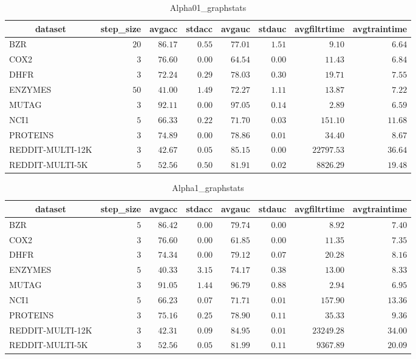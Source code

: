 \begin{table}[!tbp]
\caption{Alpha01_graphstats\label{Alpha01_graphstats}} 
{\centering
\begin{tabular}{lrrrrrrr}
\hline\hline
\multicolumn{1}{c}{dataset}&\multicolumn{1}{c}{step_size}&\multicolumn{1}{c}{avgacc}&\multicolumn{1}{c}{stdacc}&\multicolumn{1}{c}{avgauc}&\multicolumn{1}{c}{stdauc}&\multicolumn{1}{c}{avgfiltrtime}&\multicolumn{1}{c}{avgtraintime}\tabularnewline
\hline
BZR&$20$&$86.17$&$0.55$&$77.01$&$1.51$&$    9.10$&$ 6.64$\tabularnewline
COX2&$ 3$&$76.60$&$0.00$&$64.54$&$0.00$&$   11.43$&$ 6.84$\tabularnewline
DHFR&$ 3$&$72.24$&$0.29$&$78.03$&$0.30$&$   19.71$&$ 7.55$\tabularnewline
ENZYMES&$50$&$41.00$&$1.49$&$72.27$&$1.11$&$   13.87$&$ 7.22$\tabularnewline
MUTAG&$ 3$&$92.11$&$0.00$&$97.05$&$0.14$&$    2.89$&$ 6.59$\tabularnewline
NCI1&$ 5$&$66.33$&$0.22$&$71.70$&$0.03$&$  151.10$&$11.68$\tabularnewline
PROTEINS&$ 3$&$74.89$&$0.00$&$78.86$&$0.01$&$   34.40$&$ 8.67$\tabularnewline
REDDIT-MULTI-12K&$ 3$&$42.67$&$0.05$&$85.15$&$0.00$&$22797.53$&$36.64$\tabularnewline
REDDIT-MULTI-5K&$ 5$&$52.56$&$0.50$&$81.91$&$0.02$&$ 8826.29$&$19.48$\tabularnewline
\hline
\end{tabular}}
\end{table}
\begin{table}[!tbp]
\caption{Alpha1_graphstats\label{Alpha1_graphstats}} 
{\centering
\begin{tabular}{lrrrrrrr}
\hline\hline
\multicolumn{1}{c}{dataset}&\multicolumn{1}{c}{step_size}&\multicolumn{1}{c}{avgacc}&\multicolumn{1}{c}{stdacc}&\multicolumn{1}{c}{avgauc}&\multicolumn{1}{c}{stdauc}&\multicolumn{1}{c}{avgfiltrtime}&\multicolumn{1}{c}{avgtraintime}\tabularnewline
\hline
BZR&$5$&$86.42$&$0.00$&$79.74$&$0.00$&$    8.92$&$ 7.40$\tabularnewline
COX2&$3$&$76.60$&$0.00$&$61.85$&$0.00$&$   11.35$&$ 7.35$\tabularnewline
DHFR&$3$&$74.34$&$0.00$&$79.12$&$0.07$&$   20.28$&$ 8.16$\tabularnewline
ENZYMES&$5$&$40.33$&$3.15$&$74.17$&$0.38$&$   13.00$&$ 8.33$\tabularnewline
MUTAG&$3$&$91.05$&$1.44$&$96.79$&$0.88$&$    2.94$&$ 6.95$\tabularnewline
NCI1&$5$&$66.23$&$0.07$&$71.71$&$0.01$&$  157.90$&$13.36$\tabularnewline
PROTEINS&$3$&$75.16$&$0.25$&$78.90$&$0.11$&$   35.33$&$ 9.36$\tabularnewline
REDDIT-MULTI-12K&$3$&$42.31$&$0.09$&$84.95$&$0.01$&$23249.28$&$34.00$\tabularnewline
REDDIT-MULTI-5K&$3$&$52.56$&$0.05$&$81.99$&$0.11$&$ 9367.89$&$20.09$\tabularnewline
\hline
\end{tabular}}
\end{table}
